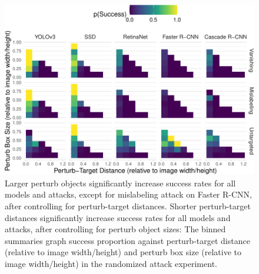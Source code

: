 \begin{figure}[tb]

{\centering \includegraphics{imgs/perturb_bbox_and_object_dist_graph-1} 

}

\caption{Larger perturb objects significantly increase success rates for all models and attacks, except for mislabeling attack on Faster R-CNN, after controlling for perturb-target distances. Shorter perturb-target distances significantly increase success rates for all models and attacks, after controlling for perturb object sizes:  The binned summaries graph success proportion against perturb-target distance (relative to image width/height) and perturb box size (relative to image width/height) in the randomized attack experiment.}\label{fig:perturb_bbox_and_object_dist_graph}
\end{figure}

\begingroup\fontsize{9}{11}\selectfont

